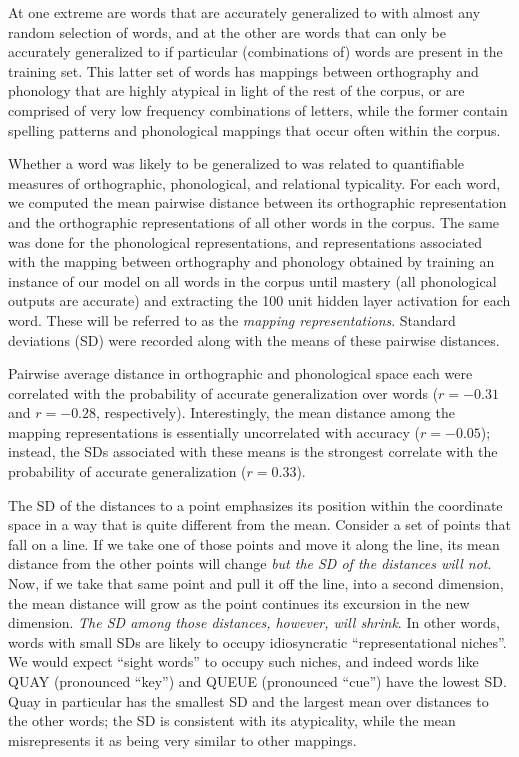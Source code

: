 \documentclass[10pt,letterpaper]{article}
\newcommand{\exword}[1]{\MakeUppercase{#1}}
\begin{document}
At one extreme are words that are accurately generalized to with almost any random selection of words, and at the other are words that can only be accurately generalized to if particular (combinations of) words are present in the training set. This latter set of words has mappings between orthography and phonology that are highly atypical in light of the rest of the corpus, or are comprised of very low frequency combinations of letters, while the former contain spelling patterns and phonological mappings that occur often within the corpus.

Whether a word was likely to be generalized to was related to quantifiable measures of orthographic, phonological, and relational typicality. For each word, we computed the mean pairwise distance between its orthographic representation and the orthographic representations of all other words in the corpus. The same was done for the phonological representations, and representations associated with the mapping between orthography and phonology obtained by training an instance of our model on all words in the corpus until mastery (all phonological outputs are accurate) and extracting the 100 unit hidden layer activation for each word. These will be referred to as the \emph{mapping representations}. Standard deviations (SD) were recorded along with the means of these pairwise distances.

Pairwise average distance in orthographic and phonological space each were correlated with the probability of accurate generalization over words ($r = -0.31$ and $r = -0.28$, respectively). Interestingly, the mean distance among the mapping representations is essentially uncorrelated with accuracy ($r = -0.05$); instead, the SDs associated with these means is the strongest correlate with the probability of accurate generalization ($r = 0.33$). 

The SD of the distances to a point emphasizes its position within the coordinate space in a way that is quite different from the mean. Consider a set of points that fall on a line. If we take one of those points and move it along the line, its mean distance from the other points will change \emph{but the SD of the distances will not}. Now, if we take that same point and pull it off the line, into a second dimension, the mean distance will grow as the point continues its excursion in the new dimension. \emph{The SD among those distances, however, will shrink}. In other words, words with small SDs are likely to occupy idiosyncratic ``representational niches''. We would expect ``sight words'' to occupy such niches, and indeed words like \exword{quay} (pronounced ``key'') and \exword{queue} (pronounced ``cue'') have the lowest SD. Quay in particular has the  smallest SD and the  largest mean over distances to the other words; the SD is consistent with its atypicality, while the mean misrepresents it as being very similar to other mappings.
\end{document}
